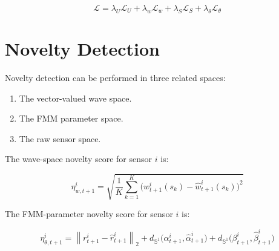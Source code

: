 \documentclass[a4paper]{article}
\begin{document}
        \begin{equation}
            \mathcal{L}
            =
            \lambda_U
            \mathcal{L}_{U}
            +
            \lambda_w
            \mathcal{L}_{w}
            +
            \lambda_S
            \mathcal{L}_{S}
            +
            \lambda_{\theta}
            \mathcal{L}_{\theta}
        \end{equation}
    
    
    \section{Novelty Detection}
        
        Novelty detection can be performed in three related spaces:
        
        \begin{enumerate}
            \item The vector-valued wave space.
            
            \item The FMM parameter space.
            
            \item The raw sensor space.
        \end{enumerate}
        
        The wave-space novelty score for sensor \(i\) is:
        
        \begin{equation}
            \eta_{w,t+1}^i
            =
            \sqrt{
                \frac{1}{K}
                \sum_{k=1}^{K}
                \bigl(
                w_{t+1}^i(s_k)
                -
                \hat{w}_{t+1}^i(s_k)
                \bigr)^2
            }
        \end{equation}
        
        The FMM-parameter novelty score for sensor \(i\) is:
        
        \begin{equation}
            \eta_{\theta,t+1}^i
            =
            \left\lVert
                r_{t+1}^i
            -
                \hat{r}_{t+1}^i
            \right\rVert_2
            +
            d_{\mathbb{S}^1}
            \bigl(
            \alpha_{t+1}^i,
            \hat{\alpha}_{t+1}^i
            )
            +
            d_{\mathbb{S}^1}
            \bigl(
            \beta_{t+1}^i,
            \hat{\beta}_{t+1}^i
            )
        \end{equation}
        
\end{document}
